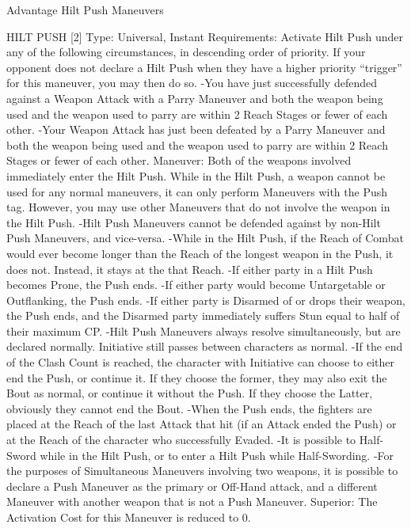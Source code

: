 \documentclass[oneside,11pt,english]{book}
\begin{document}
 


Advantage Hilt Push Maneuvers 

 

HILT PUSH [2] 
Type: Universal, Instant 
Requirements: Activate Hilt Push under any of the following circumstances, in descending order of 
priority. If your opponent does not declare a Hilt Push when they have a higher priority “trigger” for this 
maneuver, you may then do so. 
-You have just successfully defended against a Weapon Attack with a Parry Maneuver and both the 
weapon being used and the weapon used to parry are within 2 Reach Stages or fewer of each other. 
-Your Weapon Attack has just been defeated by a Parry Maneuver and both the weapon being used and 
the weapon used to parry are within 2 Reach Stages or fewer of each other. 
Maneuver: Both of the weapons involved immediately enter the Hilt Push. 
While in the Hilt Push, a weapon cannot be used for any normal maneuvers, it can only perform 
Maneuvers with the Push tag. However, you may use other Maneuvers that do not involve the weapon in 
the Hilt Push. 
-Hilt Push Maneuvers cannot be defended against by non-Hilt Push Maneuvers, and vice-versa. 
-While in the Hilt Push, if the Reach of Combat would ever become longer than the Reach of the longest 
weapon in the Push, it does not. Instead, it stays at the that Reach. 
-If either party in a Hilt Push becomes Prone, the Push ends. 
-If either party would become Untargetable or Outflanking, the Push ends. 
-If either party is Disarmed of or drops their weapon, the Push ends, and the Disarmed party immediately 
suffers Stun equal to half of their maximum CP. 
-Hilt Push Maneuvers always resolve simultaneously, but are declared normally. Initiative still passes 
between characters as normal. 
-If the end of the Clash Count is reached, the character with Initiative can choose to either end the Push, 
or continue it. If they choose the former, they may also exit the Bout as normal, or continue it without the 
Push. If they choose the Latter, obviously they cannot end the Bout. 
-When the Push ends, the fighters are placed at the Reach of the last Attack that hit (if an Attack ended 
the Push) or at the Reach of the character who successfully Evaded. 
-It is possible to Half-Sword while in the Hilt Push, or to enter a Hilt Push while Half-Swording. 
-For the purposes of Simultaneous Maneuvers involving two weapons, it is possible to declare a Push 
Maneuver as the primary or Off-Hand attack, and a different Maneuver with another weapon that is not a 
Push Maneuver. 
Superior: The Activation Cost for this Maneuver is reduced to 0. 
\end{document}
